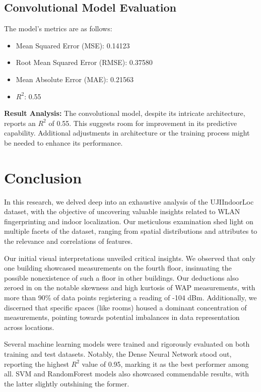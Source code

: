 \documentclass[conference]{IEEEtran}
\begin{document}
\subsection{Convolutional Model Evaluation}

The model's metrics are as follows:

\begin{itemize}
    \item Mean Squared Error (MSE): 0.14123
    \item Root Mean Squared Error (RMSE): 0.37580
    \item Mean Absolute Error (MAE): 0.21563
    \item \( R^2 \): 0.55
\end{itemize}

\textbf{Result Analysis:}
The convolutional model, despite its intricate architecture, reports an \( R^2 \) of 0.55. This suggests room for improvement in its predictive capability. Additional adjustments in architecture or the training process might be needed to enhance its performance.

\section*{Conclusion}

In this research, we delved deep into an exhaustive analysis of the UJIIndoorLoc dataset, with the objective of uncovering valuable insights related to WLAN fingerprinting and indoor localization. Our meticulous examination shed light on multiple facets of the dataset, ranging from spatial distributions and attributes to the relevance and correlations of features.

Our initial visual interpretations unveiled critical insights. We observed that only one building showcased measurements on the fourth floor, insinuating the possible nonexistence of such a floor in other buildings. Our deductions also zeroed in on the notable skewness and high kurtosis of WAP measurements, with more than 90\% of data points registering a reading of -104 dBm. Additionally, we discerned that specific spaces (like rooms) housed a dominant concentration of measurements, pointing towards potential imbalances in data representation across locations.

Several machine learning models were trained and rigorously evaluated on both training and test datasets. Notably, the Dense Neural Network stood out, reporting the highest \( R^2 \) value of 0.95, marking it as the best performer among all. SVM and RandomForest models also showcased commendable results, with the latter slightly outshining the former.
\end{document}
